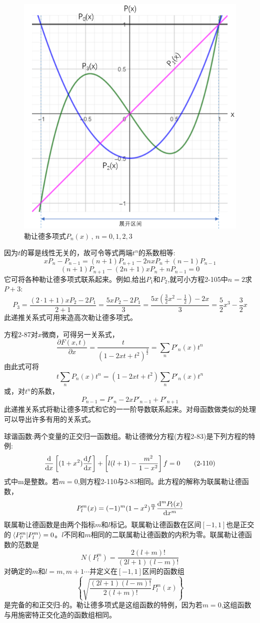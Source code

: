 \begin{figure}[htbp]
    \centering
    \includegraphics[scale=0.4]{./fig/2-6.png}
    \caption{勒让德多项式$P_n(x) \, , \, n=0,1,2,3$}
\end{figure}

因为$t$的幂是线性无关的，故可令等式两端$t^n$的系数相等:
\[xP_n-P_{n-1}=(n+1)P_{n+1}-2nxP_n+(n-1)P_{n-1}\]
\[(n+1)P_{n+1}-(2n+1)xP_n+nP_{n-1}=0 \tag{2-105}\]
它可将各种勒让德多项式联系起来。例如,给出$P_1$和$P_2$,就可小方程2-105中$n=2$求$P+3$:
\[P_3=\frac{(2 \cdot 1+1)xP_2-2P_1}{2+1}=\frac{5xP_2-2P_1}{3}=\frac{5x\left(\frac{3}{2}x^2-\frac{1}{2}\right)-2x}{3}=\frac{5}{2}x^3-\frac{3}{2}x \tag{2-106}\]
此递推关系式可用来造高次勒让德多项式。

方程2-87对$x$微商，可得另一关系式，
\[\frac{\partial F(x,t)}{\partial x}=\frac{t}{(1-2xt+t^2)^{\frac{3}{2}}}=\sum_nP'_n(x)t^n \tag{2-107}\]
由此式可将
\[t\sum_nP_n(x)t^n=(1-2xt+t^2)\sum_nP'_n(x)t^n \tag{2-108}\]
或，对$t^n$的系数，
\[P_{n-1}=P'_n-2xP'_{n-1}+P'_{n+1} \tag{2-109}\]
此递推关系式将勒让德多项式和它的一一阶导数联系起来。对母函数做类似的处理可以导出许多有用的关系式。

球谐函数:两个变量的正交归一函数组。勒让德微分方程(方程2-83)是下列方程的特例:
\[\dv{x}\left[(1+x^2)\dv{f}{x}\right]+\left[l(l+1)-\frac{m^2}{1-x^2}\right]f=0 \tag{2-110}\]
式中m是整数。若$m=0$,则方程2-110与2-83相同。此方程的解称为联属勒让德函数，
\[P_l^m(x)=(-1)^m(1-x^2)^{\frac{m}{2}}\dv[m]{P_l(x)}{x}\]
联属勒让德函数是由两个指标$m$和$l$标记。联属勒让德函数在区间$[-1,1]$也是正交的$\bra*{P_{l'}^m}\ket*{P_{l}^m}=0$。$l$不同和$m$相同的二联属勒让德函数的内积为零。联属勒让德函数的范数是
\[N(P_l^m)=\frac{2(l+m)!}{(2l+1)(l-m)!}\]
对确定的$m$和$l=m,m+1 \cdots $并定义在$[-1,1]$区间的函数组
\[\left \{\sqrt{\frac{(2l+1)(l-m)!}{2(l+m)!}}P_l^m(x) \right \}\]
是完备的和正交归-的。勒让德多项式是这组函数的特例，因为若$m=0$,这组函数与用施密特正交化造的函数组相同。

